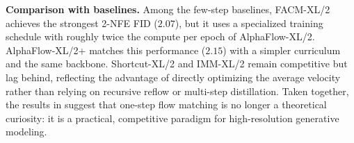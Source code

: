 \textbf{Comparison with baselines.} Among the few-step baselines, FACM-XL/2 achieves the strongest 2-NFE FID ($2.07$), but it uses a specialized training schedule with roughly twice the compute per epoch of AlphaFlow-XL/2. AlphaFlow-XL/2+ matches this performance ($2.15$) with a simpler curriculum and the same backbone. Shortcut-XL/2 and IMM-XL/2 remain competitive but lag behind, reflecting the advantage of directly optimizing the average velocity rather than relying on recursive reflow or multi-step distillation. Taken together, the results in  suggest that one-step flow matching is no longer a theoretical curiosity: it is a practical, competitive paradigm for high-resolution generative modeling.
